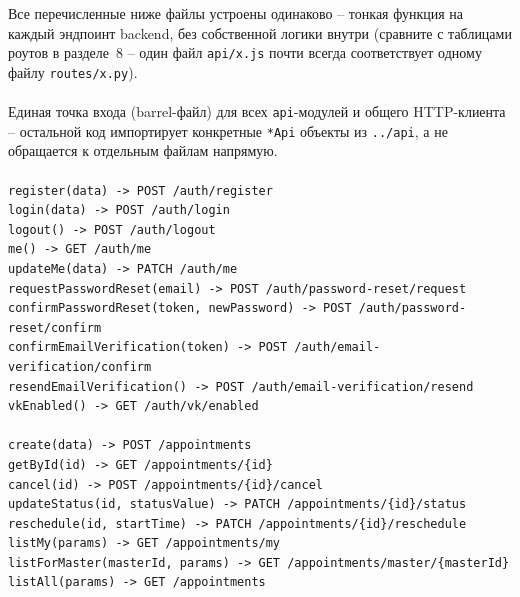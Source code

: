 Все перечисленные ниже файлы устроены одинаково -- тонкая функция на
каждый эндпоинт backend, без собственной логики внутри (сравните с
таблицами роутов в разделе~8 -- один файл \texttt{api/x.js} почти всегда
соответствует одному файлу \texttt{routes/x.py}).

\paragraph{}
Единая точка входа (barrel-файл) для всех \texttt{api}-модулей и общего
HTTP-клиента -- остальной код импортирует конкретные \texttt{*Api}
объекты из \texttt{../api}, а не обращается к отдельным файлам напрямую.

\paragraph{}
\begin{verbatim}
register(data) -> POST /auth/register
login(data) -> POST /auth/login
logout() -> POST /auth/logout
me() -> GET /auth/me
updateMe(data) -> PATCH /auth/me
requestPasswordReset(email) -> POST /auth/password-reset/request
confirmPasswordReset(token, newPassword) -> POST /auth/password-reset/confirm
confirmEmailVerification(token) -> POST /auth/email-verification/confirm
resendEmailVerification() -> POST /auth/email-verification/resend
vkEnabled() -> GET /auth/vk/enabled
\end{verbatim}

\paragraph{}
\begin{verbatim}
create(data) -> POST /appointments
getById(id) -> GET /appointments/{id}
cancel(id) -> POST /appointments/{id}/cancel
updateStatus(id, statusValue) -> PATCH /appointments/{id}/status
reschedule(id, startTime) -> PATCH /appointments/{id}/reschedule
listMy(params) -> GET /appointments/my
listForMaster(masterId, params) -> GET /appointments/master/{masterId}
listAll(params) -> GET /appointments
\end{verbatim}

